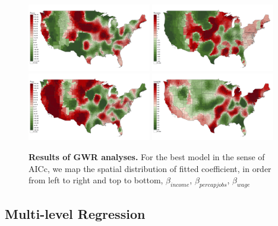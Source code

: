 \documentclass[3p,times,procedia]{elsarticle}
\begin{document}


\begin{figure}
\centering
\includegraphics[width=0.48\textwidth]{figures/gwr_allbest_betaincome}
\includegraphics[width=0.48\textwidth]{figures/gwr_allbest_betapercapjobs}\\
\includegraphics[width=0.48\textwidth]{figures/gwr_allbest_wage}
\includegraphics[width=0.48\textwidth]{figures/gwr_allbest_LocalR2}
\caption{\textbf{Results of GWR analyses.} For the best model in the sense of AICc, we map the spatial distribution of fitted coefficient, in order from left to right and top to bottom, $\beta_{income}$, $\beta_{percapjobs}$, $\beta_{wage}$}
\label{fig:gwr}
\end{figure}


\subsection{Multi-level Regression}
\end{document}
